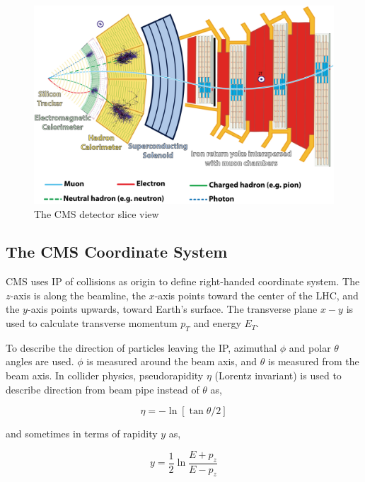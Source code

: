 \begin{figure}[!ht]
  \centering
  \includegraphics[width=\textwidth]{figures/cms_slice.png}
  \caption[The CMS detector slice view]%
  {The CMS detector slice view~\cite{image-cms-slice}}%
  \label{fig:cms-slice}
\end{figure}

\subsection{
  The CMS Coordinate System
}\label{ch_cms:cms-coordinate}

CMS uses \gls{IP} of collisions as origin to define right-handed
coordinate system. The \( z \)-axis is along the beamline,
the \( x \)-axis points toward the center of the \gls{LHC},
and the \( y \)-axis points upwards, toward Earth's surface.
The transverse plane \( x - y \) is used to calculate
transverse momentum \( p_{T} \) and energy \( E_{T} \).

To describe the direction of particles leaving the \gls{IP},
azimuthal \( \phi \) and polar \( \theta \) angles are used.
\( \phi \) is measured around the beam axis,
and \( \theta \) is measured from the beam axis.
In collider physics, pseudorapidity \( \eta \) (Lorentz invariant) is used
to describe direction from beam pipe instead of \( \theta \) as,

\begin{equation}
  \eta = - \ln[\tan{\theta/2}]
\end{equation}

and sometimes in terms of rapidity \( y \) as,

\begin{equation}
  y = \frac{1}{2} \ln{\frac{E+p_{z}}{E-p_{z}}}
\end{equation}

